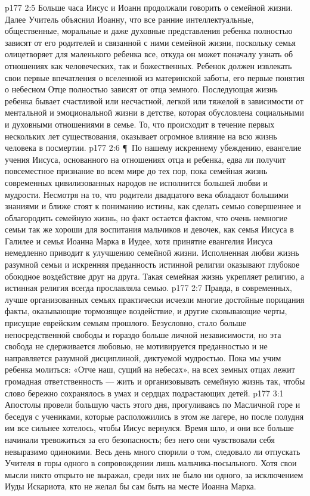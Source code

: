 \vs p177 2:5 Больше часа Иисус и Иоанн продолжали говорить о семейной жизни. Далее Учитель объяснил Иоанну, что все ранние интеллектуальные, общественные, моральные и даже духовные представления ребенка полностью зависят от его родителей и связанной с ними семейной жизни, поскольку семья олицетворяет для маленького ребенка все, откуда он может поначалу узнать об отношениях как человеческих, так и божественных. Ребенок должен извлекать свои первые впечатления о вселенной из материнской заботы, его первые понятия о небесном Отце полностью зависят от отца земного. Последующая жизнь ребенка бывает счастливой или несчастной, легкой или тяжелой в зависимости от ментальной и эмоциональной жизни в детстве, которая обусловлена социальными и духовными отношениями в семье. То, что происходит в течение первых нескольких лет существования, оказывает огромное влияние на всю жизнь человека в посмертии.
\vs p177 2:6 \P\ По нашему искреннему убеждению, евангелие учения Иисуса, основанного на отношениях отца и ребенка, едва ли получит повсеместное признание во всем мире до тех пор, пока семейная жизнь современных цивилизованных народов не исполнится большей любви и мудрости. Несмотря на то, что родители двадцатого века обладают большими знаниями и ближе стоят к пониманию истины, как сделать семью совершеннее и облагородить семейную жизнь, но факт остается фактом, что очень немногие семьи так же хороши для воспитания мальчиков и девочек, как семья Иисуса в Галилее и семья Иоанна Марка в Иудее, хотя принятие евангелия Иисуса немедленно приводит к улучшению семейной жизни. Исполненная любви жизнь разумной семьи и искренняя преданность истинной религии оказывают глубокое обоюдное воздействие друг на друга. Такая семейная жизнь укрепляет религию, а истинная религия всегда прославляла семью.
\vs p177 2:7 Правда, в современных, лучше организованных семьях практически исчезли многие достойные порицания факты, оказывающие тормозящее воздействие, и другие сковывающие черты, присущие еврейским семьям прошлого. Безусловно, стало больше непосредственной свободы и гораздо больше личной независимости, но эта свобода не сдерживается любовью, не мотивируется преданностью и не направляется разумной дисциплиной, диктуемой мудростью. Пока мы учим ребенка молиться: «Отче наш, сущий на небесах», на всех земных отцах лежит громадная ответственность --- жить и организовывать семейную жизнь так, чтобы слово  бережно сохранялось в умах и сердцах подрастающих детей.
\vs p177 3:1 Апостолы провели большую часть этого дня, прогуливаясь по Масличной горе и беседуя с учениками, которые расположились в этом же лагере, но после полудня им все сильнее хотелось, чтобы Иисус вернулся. Время шло, и они все больше начинали тревожиться за его безопасность; без него они чувствовали себя невыразимо одинокими. Весь день много спорили о том, следовало ли отпускать Учителя в горы одного в сопровождении лишь мальчика\hyp{}посыльного. Хотя свои мысли никто открыто не выражал, среди них не было ни одного, за исключением Иуды Искариота, кто не желал бы сам быть на месте Иоанна Марка.
